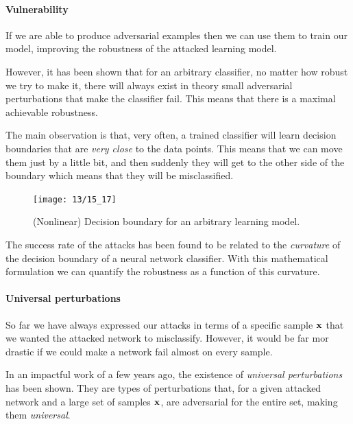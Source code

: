 \paragraph{Vulnerability}

If we are able to produce adversarial examples then we can use them to train our model, improving the robustness of the attacked learning model.

However, it has been shown that for an arbitrary classifier, no matter how robust we try to make it, there will always exist in theory small adversarial perturbations that make the classifier fail. This means that there is a maximal achievable robustness.

The main observation is that, very often, a trained classifier will learn decision boundaries that are \emph{very close} to the data points. This means that we can move them just by a little bit, and then suddenly they will get to the other side of the boundary which means that they will be misclassified.
\begin{figure}[H]
	\centering
	\texttt{[image: 13/15\_17]}
	\caption{(Nonlinear) Decision boundary for an arbitrary learning model.}\label{fig:boundary}	
\end{figure}
The success rate of the attacks has been found to be related to the \emph{curvature} of the decision boundary of a neural network classifier. With this mathematical formulation we can quantify the robustness as a function of this curvature.
\\

\paragraph{Universal perturbations}

So far we have always expressed our attacks in terms of a specific sample $\vb{x}$ that we wanted the attacked network to misclassify. However, it would be far mor drastic if we could make a network fail almost on every sample.

In an impactful work of a few years ago, the existence of \emph{universal perturbations} has been shown.
They are types of perturbations that, for a given attacked network and a large set of samples $\vb{x}$, are adversarial for the entire set, making them \emph{universal}.

